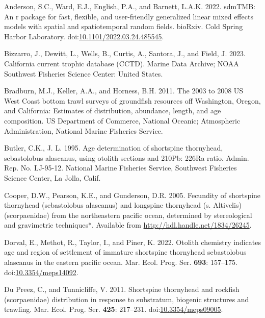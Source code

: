 \documentclass[11pt,
  english,
  letterpaper,
]{article}
\newlength{\cslhangindent}
\newenvironment{CSLReferences}[2] %
 {%
  \setlength{\parindent}{0pt}
  \ifodd #1 \everypar{\setlength{\hangindent}{\cslhangindent}}\ignorespaces\fi
  \ifnum #2 > 0
  \setlength{\parskip}{#2\baselineskip}
  \fi
 }%
 {}
\begin{document}
\hypertarget{refs}{}
\begin{CSLReferences}{1}{0}
\leavevmode{}%
Anderson, S.C., Ward, E.J., English, P.A., and Barnett, L.A.K. 2022. sdmTMB: An r package for fast, flexible, and user-friendly generalized linear mixed effects models with spatial and spatiotemporal random fields. bioRxiv. Cold Spring Harbor Laboratory. doi:\href{https://doi.org/10.1101/2022.03.24.485545}{10.1101/2022.03.24.485545}.

\leavevmode{}%
Bizzarro, J., Dewitt, L., Wells, B., Curtis, A., Santora, J., and Field, J. 2023. California current trophic database (CCTD). Marine Data Archive; NOAA Southwest Fisheries Science Center: United States.

\leavevmode{}%
Bradburn, M.J., Keller, A.A., and Horness, B.H. 2011. The 2003 to 2008 {US} {West} {Coast} bottom trawl surveys of groundfish resources off {Washington}, {Oregon}, and {California}: Estimates of distribution, abundance, length, and age composition. US Department of Commerce, National Oceanic; Atmospheric Administration, National Marine Fisheries Service.

\leavevmode{}%
Butler, C.K., J. L. 1995. Age determination of shortspine thornyhead, sebastolobus alascanus, using otolith sections and 210Pb: 226Ra ratio. Admin. Rep. No. LJ-95-12. National Marine Fisheries Service, Southwest Fisheries Science Center, La Jolla, Calif.

\leavevmode{}%
Cooper, D.W., Pearson, K.E., and Gunderson, D.R. 2005. Fecundity of shortspine thornyhead (sebastolobus alascanus) and longspine thornyhead (s. Altivelis) (scorpaenidae) from the northeastern pacific ocean, determined by stereological and gravimetric techniques*. Available from \url{http://hdl.handle.net/1834/26245}.

\leavevmode{}%
Dorval, E., Methot, R., Taylor, I., and Piner, K. 2022. Otolith chemistry indicates age and region of settlement of immature shortspine thornyhead sebastolobus alascanus in the eastern pacific ocean. Mar. Ecol. Prog. Ser. \textbf{693}: 157--175. doi:\href{https://doi.org/10.3354/meps14092}{10.3354/meps14092}.

\leavevmode{}%
Du Preez, C., and Tunnicliffe, V. 2011. Shortspine thornyhead and rockfish (scorpaenidae) distribution in response to substratum, biogenic structures and trawling. Mar. Ecol. Prog. Ser. \textbf{425}: 217--231. doi:\href{https://doi.org/10.3354/meps09005}{10.3354/meps09005}.


\end{CSLReferences}
\end{document}
